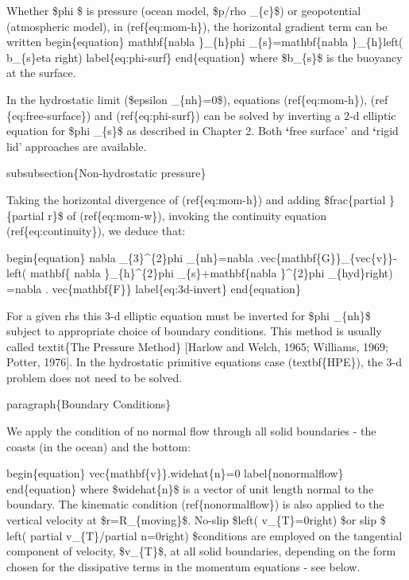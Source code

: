 \documentclass[letterpaper,10pt,english]{sphinxmanual}
\begin{document}
Whether \$phi \$ is pressure (ocean model, \$p/rho \_\{c\}\$) or geopotential
(atmospheric model), in (ref\{eq:mom-h\}), the horizontal gradient term can
be written
begin\{equation\}
mathbf\{nabla \}\_\{h\}phi \_\{s\}=mathbf\{nabla \}\_\{h\}left( b\_\{s\}eta right)
label\{eq:phi-surf\}
end\{equation\}
where \$b\_\{s\}\$ is the buoyancy at the surface.

In the hydrostatic limit (\$epsilon \_\{nh\}=0\$), equations (ref\{eq:mom-h\}), (ref
\{eq:free-surface\}) and (ref\{eq:phi-surf\}) can be solved by inverting a 2-d
elliptic equation for \$phi \_\{s\}\$ as described in Chapter 2. Both {\color{red}\bfseries{}{}`}free
surface' and {\color{red}\bfseries{}{}`}rigid lid' approaches are available.

subsubsection\{Non-hydrostatic pressure\}

Taking the horizontal divergence of (ref\{eq:mom-h\}) and adding
\$frac\{partial \}\{partial r\}\$ of (ref\{eq:mom-w\}), invoking the continuity equation
(ref\{eq:continuity\}), we deduce that:

begin\{equation\}
nabla \_\{3\}\textasciicircum{}\{2\}phi \_\{nh\}=nabla .vec\{mathbf\{G\}\}\_\{vec\{v\}\}-left( mathbf\{
nabla \}\_\{h\}\textasciicircum{}\{2\}phi \_\{s\}+mathbf\{nabla \}\textasciicircum{}\{2\}phi \_\{hyd\}right) =nabla .
vec\{mathbf\{F\}\}  label\{eq:3d-invert\}
end\{equation\}

For a given rhs this 3-d elliptic equation must be inverted for \$phi \_\{nh\}\$
subject to appropriate choice of boundary conditions. This method is usually
called textit\{The Pressure Method\} {[}Harlow and Welch, 1965; Williams, 1969;
Potter, 1976{]}. In the hydrostatic primitive equations case (textbf\{HPE\}),
the 3-d problem does not need to be solved.

paragraph\{Boundary Conditions\}

We apply the condition of no normal flow through all solid boundaries - the
coasts (in the ocean) and the bottom:

begin\{equation\}
vec\{mathbf\{v\}\}.widehat\{n\}=0  label\{nonormalflow\}
end\{equation\}
where \$widehat\{n\}\$ is a vector of unit length normal to the boundary. The
kinematic condition (ref\{nonormalflow\}) is also applied to the vertical
velocity at \$r=R\_\{moving\}\$. No-slip \$left( v\_\{T\}=0right) \$or slip \$
left( partial v\_\{T\}/partial n=0right) \$conditions are employed on the
tangential component of velocity, \$v\_\{T\}\$, at all solid boundaries,
depending on the form chosen for the dissipative terms in the momentum
equations - see below.
\end{document}
